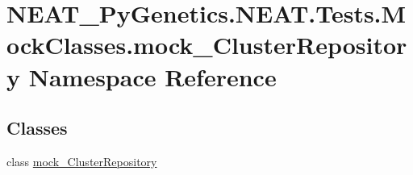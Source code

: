 \hypertarget{namespaceNEAT__PyGenetics_1_1NEAT_1_1Tests_1_1MockClasses_1_1mock__ClusterRepository}{}\section{N\+E\+A\+T\+\_\+\+Py\+Genetics.\+N\+E\+A\+T.\+Tests.\+Mock\+Classes.\+mock\+\_\+\+Cluster\+Repository Namespace Reference}
\label{namespaceNEAT__PyGenetics_1_1NEAT_1_1Tests_1_1MockClasses_1_1mock__ClusterRepository}
\subsection*{Classes}
\begin{DoxyCompactItemize}
\item 
class \hyperlink{classNEAT__PyGenetics_1_1NEAT_1_1Tests_1_1MockClasses_1_1mock__ClusterRepository_1_1mock__ClusterRepository}{mock\+\_\+\+Cluster\+Repository}
\end{DoxyCompactItemize}
